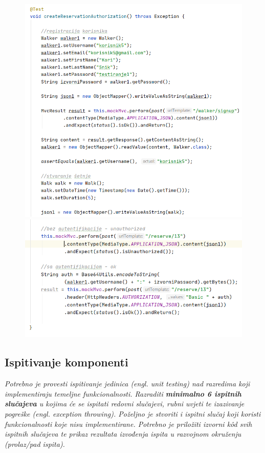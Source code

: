  			\begin{figure}[H]
 				\hspace*{-0.18in}
 				\includegraphics[scale=0.75]{slike/walker4.1.PNG}
 				\hspace*{-0.4in}
 				\includegraphics[scale=0.75]{slike/walker4.2.PNG} %
 				\centering
 			\end{figure}
 			
	
			
			\subsection{Ispitivanje komponenti}
			\textit{Potrebno je provesti ispitivanje jedinica (engl. unit testing) nad razredima koji implementiraju temeljne funkcionalnosti. Razraditi \textbf{minimalno 6 ispitnih slučajeva} u kojima će se ispitati redovni slučajevi, rubni uvjeti te izazivanje pogreške (engl. exception throwing). Poželjno je stvoriti i ispitni slučaj koji koristi funkcionalnosti koje nisu implementirane. Potrebno je priložiti izvorni kôd svih ispitnih slučajeva te prikaz rezultata izvođenja ispita u razvojnom okruženju (prolaz/pad ispita). }
			
